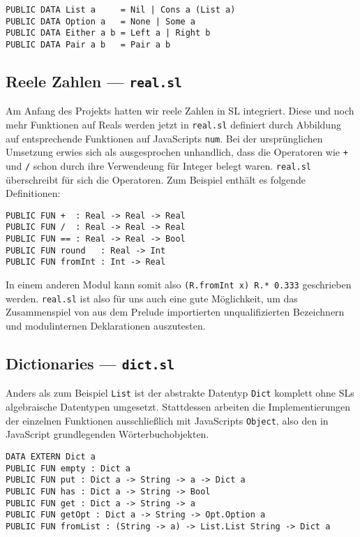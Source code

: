 \documentclass[runningheads]{llncs}
\begin{document}
\begin{verbatim}
PUBLIC DATA List a     = Nil | Cons a (List a)
PUBLIC DATA Option a   = None | Some a
PUBLIC DATA Either a b = Left a | Right b
PUBLIC DATA Pair a b   = Pair a b
\end{verbatim}

\subsection{Reele Zahlen --- \texttt{real.sl}}

Am Anfang des Projekts hatten wir reele Zahlen in SL integriert. Diese und
noch mehr Funktionen auf Reals werden jetzt in \verb|real.sl| definiert
durch Abbildung auf entsprechende Funktionen auf JavaScripts \verb|num|.
Bei der ursprünglichen Umsetzung erwies sich als ausgesprochen
unhandlich, dass die Operatoren wie \verb|+| und \verb|/| schon durch ihre
Verwendeung für Integer belegt waren. \verb|real.sl| überschreibt für sich
die Operatoren. Zum Beispiel enthält es folgende Definitionen:

\begin{verbatim}
PUBLIC FUN +  : Real -> Real -> Real
PUBLIC FUN /  : Real -> Real -> Real
PUBLIC FUN == : Real -> Real -> Bool
PUBLIC FUN round   : Real -> Int
PUBLIC FUN fromInt : Int -> Real
\end{verbatim}

In einem anderen Modul kann somit also \verb|(R.fromInt x) R.* 0.333|
geschrieben werden. \verb|real.sl| ist also für uns auch eine gute
Möglichkeit, um das Zusammenspiel von aus dem Prelude importierten
unqualifizierten Bezeichnern und modulinternen Deklarationen auszutesten.

\subsection{Dictionaries --- \texttt{dict.sl}}

Anders als zum Beispiel \verb|List| ist der abstrakte Datentyp \verb|Dict|
komplett ohne SLs algebraische Datentypen umgesetzt. Stattdessen arbeiten
die Implementierungen der einzelnen Funktionen ausschließlich mit JavaScripts
\verb|Object|, also den in JavaScript grundlegenden Wörterbuchobjekten.

\begin{verbatim}
DATA EXTERN Dict a
PUBLIC FUN empty : Dict a
PUBLIC FUN put : Dict a -> String -> a -> Dict a
PUBLIC FUN has : Dict a -> String -> Bool
PUBLIC FUN get : Dict a -> String -> a
PUBLIC FUN getOpt : Dict a -> String -> Opt.Option a
PUBLIC FUN fromList : (String -> a) -> List.List String -> Dict a
\end{verbatim}
\end{document}
